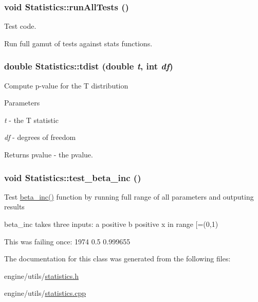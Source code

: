 \label{classStatistics_a024e673ac44377b48a9744481d6edc96}
\hypertarget{classStatistics_a7d81d74eba1f1708c0c794f7f2a47b5e}{
\subsubsection[{runAllTests}]{\setlength{\rightskip}{0pt plus 5cm}void Statistics::runAllTests ()}}
\label{classStatistics_a7d81d74eba1f1708c0c794f7f2a47b5e}


Test code. 

Run full gamut of tests against stats functions. \hypertarget{classStatistics_a16ece213e64bb53a786cb4171efe2290}{
\subsubsection[{tdist}]{\setlength{\rightskip}{0pt plus 5cm}double Statistics::tdist (double {\em t}, \/  int {\em df})}}
\label{classStatistics_a16ece213e64bb53a786cb4171efe2290}
Compute p-\/value for the T distribution


\begin{DoxyParams}{Parameters}
\item[{\em t}]-\/ the T statistic \item[{\em df}]-\/ degrees of freedom \end{DoxyParams}
\begin{DoxyReturn}{Returns}
pvalue -\/ the pvalue. 
\end{DoxyReturn}
\hypertarget{classStatistics_a35a1a03a8cd3ffe80c09518d1972f148}{
\subsubsection[{test\_\-beta\_\-inc}]{\setlength{\rightskip}{0pt plus 5cm}void Statistics::test\_\-beta\_\-inc ()}}
\label{classStatistics_a35a1a03a8cd3ffe80c09518d1972f148}
Test \hyperlink{classStatistics_a5ba99c9fa2e04ab87c0bb9fb82b36971}{beta\_\-inc()} function by running full range of all parameters and outputing results

beta\_\-inc takes three inputs: a positive b positive x in range \mbox{[}=(0,1)

This was failing once: 1974 0.5 0.999655 

The documentation for this class was generated from the following files:\begin{DoxyCompactItemize}
\item 
engine/utils/\hyperlink{statistics_8h}{statistics.h}\item 
engine/utils/\hyperlink{statistics_8cpp}{statistics.cpp}\end{DoxyCompactItemize}
